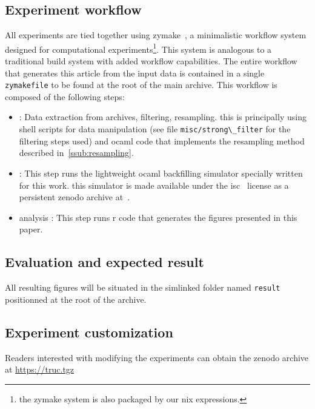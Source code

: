 \documentclass[sigconf,anonymous]{acmart}
\begin{document}
\subsection{Experiment workflow}

 All experiments are tied together using zymake~\cite{zymake}, a minimalistic
 workflow system designed for computational experiments\footnote{the zymake system
 is also packaged by our nix expressions.}. This system is
 analogous to a traditional build system with added workflow capabilities. The
 entire workflow that generates this article from the input data is contained
 in a single \lstinline[basicstyle=\ttfamily\color{blue}]|zymakefile| to be
 found at the root of the main archive. This workflow is composed of the
 following steps:

 \begin{itemize}
   \item[data]: Data extraction from archives, filtering, resampling.
     this is principally using shell scripts for data manipulation (see file
     \lstinline[basicstyle=\ttfamily\color{blue}]|misc/strong\_filter| for the
     filtering steps used) and ocaml code that implements the resampling method
     described in~\ref{ssub:resampling}.

   \item[simulation]: This step runs the lightweight ocaml backfilling
     simulator specially written for this work. this simulator is made
     available under the isc~\cite{isc} license as a persistent zenodo
     archive at~\cite{ocst}.

   \item[analysis]: This step runs r code that generates the figures
     presented in this paper.
 \end{itemize}

\subsection{Evaluation and expected result}

All resulting figures will be situated in the simlinked folder named
\lstinline[basicstyle=\ttfamily\color{blue}]|result| positionned at the root of
the archive.

\subsection{Experiment customization}

Readers interested with modifying the experiments can obtain the zenodo archive
at \url{https://truc.tgz}
\end{document}
